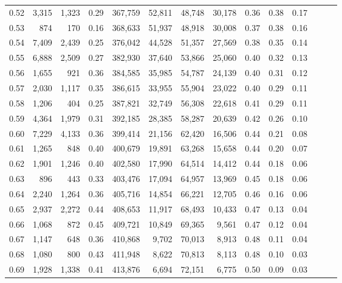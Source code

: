 \begin{tabular}{rrrrrrrrrrrrrr}
0.52 &   3,315 &  1,323 &  0.29 &  367,759 &   52,811 &  48,748 &  30,178 &  0.36 &  0.38 &      0.17 \\
0.53 &     874 &    170 &  0.16 &  368,633 &   51,937 &  48,918 &  30,008 &  0.37 &  0.38 &      0.16 \\
0.54 &   7,409 &  2,439 &  0.25 &  376,042 &   44,528 &  51,357 &  27,569 &  0.38 &  0.35 &      0.14 \\
0.55 &   6,888 &  2,509 &  0.27 &  382,930 &   37,640 &  53,866 &  25,060 &  0.40 &  0.32 &      0.13 \\
0.56 &   1,655 &    921 &  0.36 &  384,585 &   35,985 &  54,787 &  24,139 &  0.40 &  0.31 &      0.12 \\
0.57 &   2,030 &  1,117 &  0.35 &  386,615 &   33,955 &  55,904 &  23,022 &  0.40 &  0.29 &      0.11 \\
0.58 &   1,206 &    404 &  0.25 &  387,821 &   32,749 &  56,308 &  22,618 &  0.41 &  0.29 &      0.11 \\
0.59 &   4,364 &  1,979 &  0.31 &  392,185 &   28,385 &  58,287 &  20,639 &  0.42 &  0.26 &      0.10 \\
0.60 &   7,229 &  4,133 &  0.36 &  399,414 &   21,156 &  62,420 &  16,506 &  0.44 &  0.21 &      0.08 \\
0.61 &   1,265 &    848 &  0.40 &  400,679 &   19,891 &  63,268 &  15,658 &  0.44 &  0.20 &      0.07 \\
0.62 &   1,901 &  1,246 &  0.40 &  402,580 &   17,990 &  64,514 &  14,412 &  0.44 &  0.18 &      0.06 \\
0.63 &     896 &    443 &  0.33 &  403,476 &   17,094 &  64,957 &  13,969 &  0.45 &  0.18 &      0.06 \\
0.64 &   2,240 &  1,264 &  0.36 &  405,716 &   14,854 &  66,221 &  12,705 &  0.46 &  0.16 &      0.06 \\
0.65 &   2,937 &  2,272 &  0.44 &  408,653 &   11,917 &  68,493 &  10,433 &  0.47 &  0.13 &      0.04 \\
0.66 &   1,068 &    872 &  0.45 &  409,721 &   10,849 &  69,365 &   9,561 &  0.47 &  0.12 &      0.04 \\
0.67 &   1,147 &    648 &  0.36 &  410,868 &    9,702 &  70,013 &   8,913 &  0.48 &  0.11 &      0.04 \\
0.68 &   1,080 &    800 &  0.43 &  411,948 &    8,622 &  70,813 &   8,113 &  0.48 &  0.10 &      0.03 \\
0.69 &   1,928 &  1,338 &  0.41 &  413,876 &    6,694 &  72,151 &   6,775 &  0.50 &  0.09 &      0.03 \\

\end{tabular}
